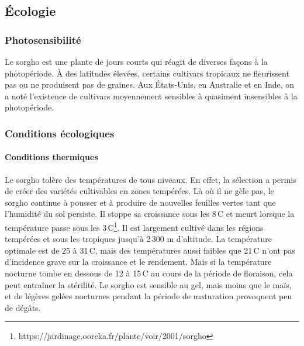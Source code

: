 \documentclass[a4paper,11pt]{article}
\begin{document}
\subsection{Écologie}

\subsubsection{Photosensibilité}

Le sorgho est une plante de jours courts qui réagit de diverses façons
à la photopériode. À des latitudes élevées, certains cultivars
tropicaux ne fleurissent pas ou ne produisent pas de graines. Aux
États-Unis, en Australie et en Inde, on a noté l’existence de
cultivars moyennement sensibles à quasiment insensibles à la
photopériode\cite{BARRO_KONDOMBO_2010}.

\subsubsection{Conditions écologiques}

\paragraph{Conditions thermiques} Le sorgho tolère des températures de
tous niveaux. En effet, la sélection a permis de créer des variétés
cultivables en zones tempérées. Là où il ne gèle pas, le sorgho
continue à pousser et à produire de nouvelles feuilles vertes tant que
l’humidité du sol persiste. Il stoppe sa croissance sous les
8\,\degree{}C et meurt lorsque la température passe sous les
3\,\degree{}C\footnote{https://jardinage.ooreka.fr/plante/voir/2001/sorgho}. Il
est largement cultivé dans les régions tempérées et sous les tropiques
jusqu’à 2\,300 m d’altitude. La température optimale est de 25 à
31\,\degree{}C, mais des températures aussi faibles que 21\,\degree{}C
n’ont pas d’incidence grave sur la croissance et le rendement. Mais si
la température nocturne tombe en dessous de 12 à 15\,\degree{}C au
cours de la période de floraison, cela peut entraîner la stérilité. Le
sorgho est sensible au gel, mais moins que le maïs, et de légères
gelées nocturnes pendant la période de maturation provoquent peu de
dégâts\cite{BARRO_KONDOMBO_2010}.
\end{document}
